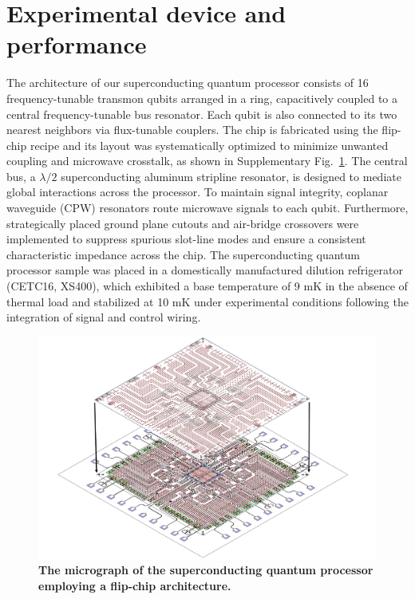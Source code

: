\documentclass[reprint,superscriptaddress,preprintnumbers,longbibliography,
amsmath,amssymb,aps,floatfix,pra,twocolumn, tightenlines %
]{revtex4-2}
\begin{document}
\renewcommand{\tablename}{Supplementary Table}
\setcounter{table}{0}
\renewcommand {\thetable} {\arabic{table}}%
\tableofcontents

    \section{Experimental device and performance}
    
    The architecture of our superconducting quantum processor consists of 16 frequency-tunable transmon qubits arranged in a ring, capacitively coupled to a central frequency-tunable bus resonator. Each qubit is also connected to its two nearest neighbors via flux-tunable couplers. The chip is fabricated using the flip-chip recipe and its layout was systematically optimized to minimize unwanted coupling and microwave crosstalk, as shown in Supplementary Fig.~\ref{chip}. The central bus, a \(\lambda/2\) superconducting aluminum stripline resonator, is designed to mediate global interactions across the processor. To maintain signal integrity, coplanar waveguide (CPW) resonators route microwave signals to each qubit. Furthermore, strategically placed ground plane cutouts and air-bridge crossovers were implemented to suppress spurious slot-line modes and ensure a consistent characteristic impedance across the chip. The superconducting quantum processor sample was placed in a domestically manufactured dilution refrigerator (CETC16, XS400), which exhibited a base temperature of 9 mK in the absence of thermal load and stabilized at 10 mK under experimental conditions following the integration of signal and control wiring.

    \begin{figure}
		\centering
		\includegraphics[width=1.0\linewidth]{suppFig/flip_chip.pdf}
		\caption{\textbf{The micrograph of the superconducting quantum processor employing a flip-chip architecture.}}
		\label{chip}
	\end{figure}
	
\end{document}
